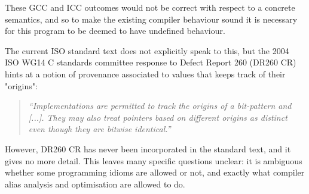 \documentclass[acmsmall,review,screen]{acmart}\settopmatter{printfolios=true,printccs=false,printacmref=false}
\begin{document}
These GCC and ICC outcomes would not be correct with respect to a concrete
semantics, and so to make the existing compiler behaviour sound it is necessary for this
program to be deemed to have undefined behaviour.
%



%
%
%
The current ISO standard text does not explicitly speak to this, but
the 2004 ISO WG14 C standards committee response to Defect Report
260 (DR260 CR)~\cite{dr260}
hints at a notion of provenance associated to values that
keeps track of their "origins":

\begin{quote}
\emph{``Implementations are permitted to track the origins of a
bit-pattern and [...]. They may also treat
pointers based on different origins as distinct even though they are
bitwise identical.''}

\end{quote}
However, DR260 CR has never been
incorporated in the standard text, and it gives no more detail.  This leaves many specific
questions unclear: it is ambiguous whether some programming idioms are allowed or
not, and exactly what compiler alias analysis and optimisation
are allowed to do.

\end{document}
